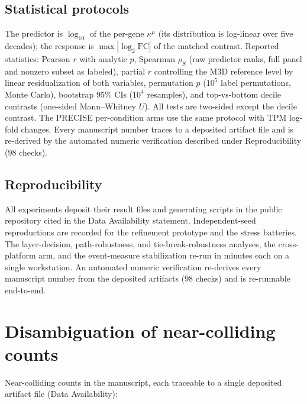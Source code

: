 \documentclass[11pt,a4paper]{article}
\theoremstyle{plain}
\theoremstyle{definition}
\theoremstyle{remark}
\newcommand{\kmu}{\kappa^{\mu}}
\begin{document}
\subsection{Statistical protocols}

The predictor is $\log_{10}$ of the per-gene $\kmu$ (its
distribution is log-linear over five decades); the response is
$\max|\log_2 \mathrm{FC}|$ of the matched contrast. Reported
statistics: Pearson $r$ with analytic $p$, Spearman $\rho_S$
(raw predictor ranks, full panel and nonzero subset as labeled),
partial $r$ controlling the M3D reference level by linear
residualization of both variables, permutation $p$ ($10^5$
label permutations, Monte Carlo), bootstrap 95\% CIs ($10^4$
resamples), and top-vs-bottom decile contrasts (one-sided
Mann--Whitney $U$). All tests are two-sided except the decile
contrast. The PRECISE per-condition arms use the same protocol
with TPM log-fold changes. Every manuscript number traces to a deposited artifact file and is re-derived by the automated numeric verification described under Reproducibility ($98$ checks).

\subsection{Reproducibility}

All experiments deposit their result files and generating
scripts in the public repository cited in the Data Availability
statement. Independent-seed reproductions are recorded for the
refinement prototype and the stress batteries. The layer-decision,
path-robustness, and tie-break-robustness analyses, the cross-platform
arm, and the event-measure stabilization re-run in minutes each on a
single workstation. An automated numeric verification re-derives every
manuscript number from the deposited artifacts ($98$ checks) and is
re-runnable end-to-end.

\appendix
\section{Disambiguation of near-colliding counts}\label{sec:counts}

Near-colliding counts in the manuscript, each traceable to a single deposited artifact file (Data Availability):
\end{document}
